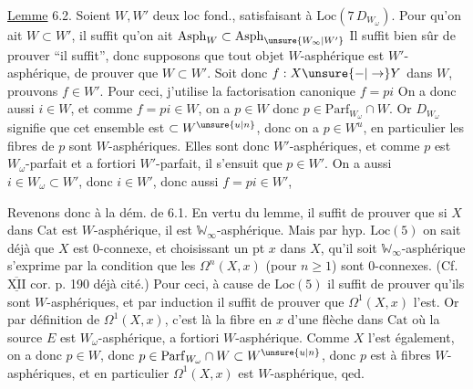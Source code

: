 \uline{Lemme} 6.2. Soient $W,W'$ deux loc fond.,  satisfaisant à $\mathrm{Loc}(7\,D_{W_\omega})$. Pour qu'on ait $W\subset W'$, il suffit qu'on ait $\mathrm{Asph}_W\subset\mathrm{Asph}_{\unsure{W_\infty|W'}}$
Il suffit bien sûr de prouver ``il suffit'', donc supposons que tout objet $W$-asphérique est $W'$-asphérique, de prouver que $W\subset W'$. Soit donc $f:X\unsure{\mathbin{-}|\to}Y$ dans $W$, prouvons $f\in W'$. Pour ceci, j'utilise la factorisation canonique $f=pi$
On a donc aussi $i\in W$, et comme $f=pi\in W$, on a $p\in W$ donc $p\in\mathrm{Parf}_{W_\omega}\cap W$. Or $D_{W_\omega}$ signifie que cet ensemble est $\subset W^{\unsure{u|n}}$, donc on a $p\in W^u$,  en particulier les fibres de $p$ sont $W$-asphériques. Elles sont donc $W'$-asphériques, et comme $p$ est $W_\omega$-parfait et a fortiori $W'$-parfait, il s'ensuit que $p\in W'$. On a aussi $i\in W_\omega\subset W'$, donc $i\in W'$, donc aussi $f=pi\in W'$, 

Revenons donc à la dém. de 6.1. En vertu du lemme, il suffit de prouver que si $X$ dans $\mathrm{Cat}$ est $W$-asphérique, il est $\mathbb W_\infty$-asphérique. Mais par hyp. $\mathrm{Loc}(5)$ on sait déjà que $X$ est $0$-connexe, et choisissant un pt $x$ dans $X$, qu'il soit $\mathbb W_\infty$-asphérique s'exprime par la condition
que les $\Omega^n(X,x)$ (pour $n\geq1$) sont $0$-connexes. (Cf. $\overline{\underline{\mathrm{XII}}}$ cor. p. 190 déjà cité.) Pour ceci, à cause de $\mathrm{Loc}(5)$ il suffit de prouver qu'ils sont $W$-asphériques, et par induction il suffit de prouver que $\Omega^1(X,x)$ l'est. Or par définition de $\Omega^1(X,x)$, c'est là la fibre en $x$ d'une flèche dans $\mathrm{Cat}$
où la source $E$ est $W_\omega$-asphérique, a fortiori $W$-asphérique. Comme $X$ l'est également, on a donc $p\in W$, donc $p\in\mathrm{Parf}_{W_\omega}\cap W\subset W^{\unsure{u|n}}$, donc $p$ est à fibres $W$-asphériques, et en particulier $\Omega^1(X,x)$ est $W$-asphérique, qed.

